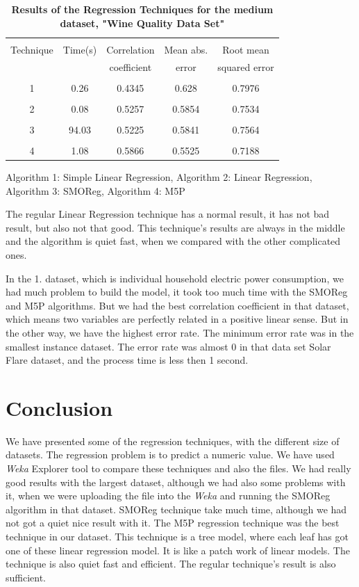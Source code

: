 \documentclass[a4paper]{article}
\begin{document}
\begin{table}
\begin{tabular}{| c | c | c |c |c |}
\hline & & & & \\
Technique & Time(s) & Correlation & Mean abs.  & Root mean \\
 & & coefficient & error & squared error  \\
\hline & & & &  \\
1  & 0.26   & 0.4345  & 0.628   &  0.7976\\ 
\hline & & & & \\
2  & 0.08  & 0.5257  & 0.5854 & 0.7534  \\ 
\hline & & & & \\
3  & 94.03  &  0.5225  & 0.5841 & 0.7564 \\ 
\hline & & & & \\
4  & 1.08  & 0.5866  & 0.5525  & 0.7188 \\ 
\hline
\end{tabular}
\caption{\textbf{Results of the Regression Techniques for the medium dataset, "Wine Quality Data Set"}}
    Algorithm 1: Simple Linear Regression,
    Algorithm 2: Linear Regression,
    Algorithm 3: SMOReg,
    Algorithm 4: M5P
\end{table}

The regular Linear Regression technique has a normal result, it has not bad result, but also not that good. This technique's results are always in the middle and the algorithm is quiet fast, when we compared with the other complicated ones.

In the 1. dataset, which is individual household electric power consumption, we had much problem to build the model, it took too much time with the SMOReg and M5P algorithms. But we had the best correlation coefficient in that dataset, which means two variables are perfectly related in a positive linear sense. But in the other way, we have the highest error rate. The minimum error rate was in the smallest instance dataset. The error rate was almost 0 in that data set Solar Flare dataset, and the process time is less then 1 second.


\section{Conclusion}

We have presented some of the regression techniques, with the different size of datasets. The regression problem is to predict a numeric value. We have used \emph{Weka} Explorer tool to compare these techniques and also the files. We had really good results with the largest dataset, although we had also some problems with it, when we were uploading the file into the \emph{Weka} and running the SMOReg algorithm in that dataset. SMOReg technique take much time, although we had not got a quiet nice result with it. The M5P regression technique was the best technique in our dataset. This technique is a tree model, where each leaf has got one of these linear regression model. It is like a patch work of linear models. The technique is also quiet fast and efficient. The regular technique's result is also sufficient. 
\end{document}
